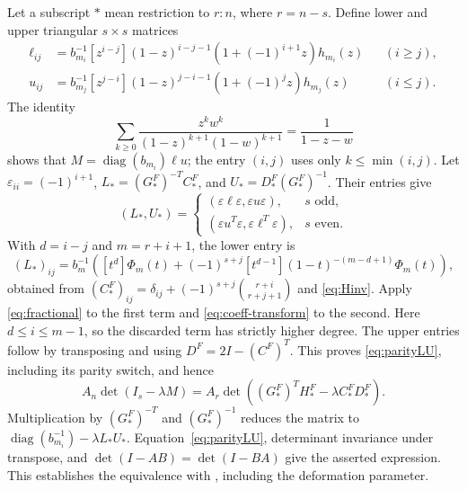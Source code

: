 \documentclass[11pt,a4paper]{amsart}
\theoremstyle{remark}\newtheorem{remark}[theorem]{Remark}
\numberwithin{equation}{section}
\DeclareMathOperator{\diag}{diag}
\begin{document}
Let a subscript $*$ mean restriction to $r:n$, where $r=n-s$. Define lower and upper triangular $s\times s$ matrices
\begin{align*}
 \ell_{ij}&=b_{m_i}^{-1}[z^{i-j}](1-z)^{i-j-1}
 (1+(-1)^{i+1}z)h_{m_i}(z) &&(i\ge j),\\
 u_{ij}&=b_{m_j}^{-1}[z^{j-i}](1-z)^{j-i-1}
 (1+(-1)^jz)h_{m_j}(z) &&(i\le j).
\end{align*}
The identity
\[
 \sum_{k\ge0}\frac{z^kw^k}{(1-z)^{k+1}(1-w)^{k+1}}=\frac1{1-z-w}
\]
shows that $M=\diag(b_{m_i})\ell u$; the entry $(i,j)$ uses only $k\le\min(i,j)$. Let $\varepsilon_{ii}=(-1)^{i+1}$, $L_*=(G^F_*)^{-T}C^F_*$, and $U_*=D^F_*(G^F_*)^{-1}$. Their entries give
\begin{equation}\label{eq:parityLU}
 (L_*,U_*)=
 \begin{cases}(\varepsilon\ell\varepsilon,\varepsilon u\varepsilon),&s\text{ odd},\\
 (\varepsilon u^T\varepsilon,\varepsilon\ell^T\varepsilon),&s\text{ even}.
 \end{cases}
\end{equation}
With $d=i-j$ and $m=r+i+1$, the lower entry is
\[
 (L_*)_{ij}=b_m^{-1}\left([t^d]\Phi_m(t)
 +(-1)^{s+j}[t^{d-1}](1-t)^{-(m-d+1)}\Phi_m(t)\right),
\]
obtained from $(C^F_*)_{ij}=\delta_{ij}+(-1)^{s+j}\binom{r+i}{r+j+1}$ and \eqref{eq:Hinv}. Apply \eqref{eq:fractional} to the first term and \eqref{eq:coeff-transform} to the second. Here $d\le i\le m-1$, so the discarded term has strictly higher degree. The upper entries follow by transposing and using $D^F=2I-(C^F)^T$. This proves \eqref{eq:parityLU}, including its parity switch, and hence
\begin{equation}\label{eq:FRcandidate}
 A_n\det(I_s-\lambda M)=A_r\det((G^F_*)^TH^F_*-\lambda C^F_*D^F_*).
\end{equation}
Multiplication by $(G^F_*)^{-T}$ and $(G^F_*)^{-1}$ reduces the matrix to $\diag(b_{m_i}^{-1})-\lambda L_*U_*$. Equation~\eqref{eq:parityLU}, determinant invariance under transpose, and $\det(I-AB)=\det(I-BA)$ give the asserted expression. This establishes the equivalence with \cite{FR}, including the deformation parameter.
\end{document}
